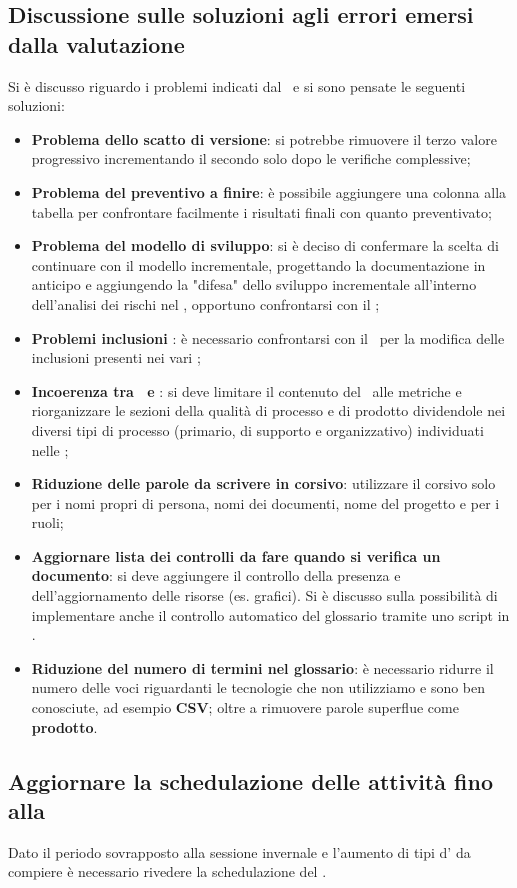 \subsection{Discussione sulle soluzioni agli errori emersi dalla valutazione }
Si è discusso riguardo i problemi indicati dal \VT\ e si sono pensate le seguenti soluzioni:
\begin{itemize}
	\item \textbf{Problema dello scatto di versione}: si potrebbe rimuovere il terzo valore progressivo incrementando il secondo solo dopo le verifiche complessive;
	\item \textbf{Problema del preventivo a finire}: è possibile aggiungere una colonna alla tabella per confrontare facilmente i risultati finali con quanto preventivato;
	\item \textbf{Problema del modello di sviluppo}: si è deciso di confermare la scelta di continuare con il modello incrementale, progettando la documentazione in anticipo e aggiungendo la "difesa" dello sviluppo incrementale all'interno dell'analisi dei rischi nel \PdP, opportuno confrontarsi con il \VT;
	\item \textbf{Problemi inclusioni \AdR}: è necessario confrontarsi con il \CR\ per la modifica delle inclusioni presenti nei vari ;
	\item \textbf{Incoerenza tra \NdP\ e \PdQ}: si deve limitare il contenuto del \PdQ\ alle metriche e riorganizzare le sezioni della qualità di processo e di prodotto dividendole nei diversi tipi di processo (primario, di supporto e organizzativo) individuati nelle \NdP;
	\item \textbf{Riduzione delle parole da scrivere in corsivo}: utilizzare il corsivo solo per i nomi propri di persona, nomi dei documenti, nome del progetto e per i ruoli;
	\item \textbf{Aggiornare lista dei controlli da fare quando si verifica un documento}: si deve aggiungere il controllo della presenza e dell'aggiornamento delle risorse (es. grafici). Si è discusso sulla possibilità di implementare anche il controllo automatico del glossario tramite uno script in .
	\item \textbf{Riduzione del numero di termini nel glossario}: è necessario ridurre il numero delle voci riguardanti le tecnologie che non utilizziamo e sono ben conosciute, ad esempio \textbf{CSV}; oltre a rimuovere parole superflue come \textbf{prodotto}.
\end{itemize}
\subsection{Aggiornare la schedulazione delle attività fino alla }
Dato il periodo sovrapposto alla sessione invernale e l'aumento di tipi d' da compiere è necessario rivedere la schedulazione del \PdP{}.
